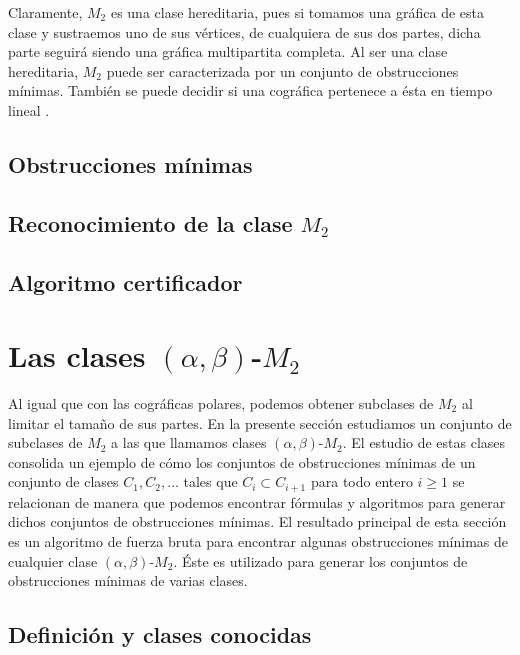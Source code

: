     Claramente, $M_2$ es una clase hereditaria, pues si tomamos una gráfica de esta clase y sustraemos uno de sus vértices, de cualquiera de sus dos partes, dicha parte seguirá siendo una gráfica multipartita completa. Al ser una clase hereditaria, $M_2$ puede ser caracterizada por un conjunto de obstrucciones mínimas. También se puede decidir si una cográfica pertenece a ésta en tiempo lineal \cite{unknown}.

    \subsection{Obstrucciones mínimas}
        

    \subsection{Reconocimiento de la clase $M_2$}
        

    \subsection{Algoritmo certificador}
        

\section{Las clases $(\alpha, \beta)$-$M_2$}

    Al igual que con las cográficas polares, podemos obtener subclases de $M_2$ al limitar el tamaño de sus partes. En la presente sección estudiamos un conjunto de subclases de $M_2$ a las que llamamos clases $(\alpha, \beta)$-$M_2$. El estudio de estas clases consolida un ejemplo de cómo los conjuntos de obstrucciones mínimas de un conjunto de clases $C_1,C_2, \dots$ tales que $C_i \subset C_{i+1}$ para todo entero $i \geq 1$ se relacionan de manera que podemos encontrar fórmulas y algoritmos para generar dichos conjuntos de obstrucciones mínimas. El resultado principal de esta sección es un algoritmo de fuerza bruta para encontrar algunas obstrucciones mínimas de cualquier clase $(\alpha, \beta)$-$M_2$. Éste es utilizado para generar los conjuntos de obstrucciones mínimas de varias clases. 
    
    \subsection{Definición y clases conocidas}
        

